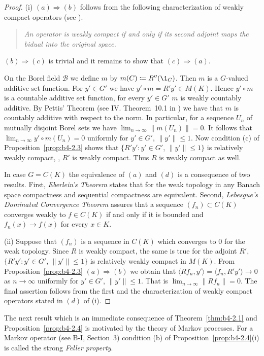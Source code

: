 \begin{proof}
(i) $(a)\Rightarrow(b)$ follows from the following characterization of
weakly compact operators (see \eg \citet[II. Proposition~9.4 ]{schaefer:1974}).
\begin{quote}
    \emph{
    An operator is weakly compact if and only if its second adjoint
    maps the bidual into the original space.
    }
\end{quote}
$(b)\Rightarrow(c)$ is trivial and it remains to show that $(c) \Rightarrow (a)$.

On the Borel field $\mathcal{B}$ we define $m$ by $m(C)  \coloneq  R''(\1_C)$.
Then $m$ is
a $G$-valued additive set function.
For $y' \in G'$ we have
$y'\circ m = R'y' \in M(K)$.
Hence $y'\circ m$ is a countable additive set function, for every $y' \in G'$  \ie $m$ is weakly countably additive.
By Pettis' Theorem (see IV. Theorem~10.1 in 
\citet{dunfordschwartz:1958}) we have
that $m$ is countably additive with respect to the norm.
In particular, for a sequence $U_n$ of mutually disjoint Borel sets we have
$\lim_{n\to\infty}\|m(U_n)\| = 0$.
It follows that $\lim_{n\to\infty}y'\circ m(U_n) = 0$ uniformly for
$y' \in G'$, $\|y'\| \leq 1$.
Now condition (c) of Proposition~\ref{prop:b4-2.3} shows that $\{R'y'
\colon y' \in G'$, $\|y'\| \leq 1\}$ is relatively weakly compact, \ie, $R'$ is
weakly compact.
Thus $R$ is weakly compact as well.

In case $G = C(K)$ the equivalence of $(a)$ and $(d)$ is a consequence of
two results. First, \emph{Eberlein's Theorem} states that for the weak topology in any Banach space compactness and sequential compactness are
equivalent.
Second, \emph{Lebesgue's Dominated Convergence Theorem} assures
that a sequence $(f_n) \subset C(K)$ converges weakly to $f \in C(K)$ if and
only if it is bounded and $f_n(x) \to f(x)$ for every $x \in K$.
	
(ii) Suppose that $(f_n)$ is a sequence in $C(K)$ which converges to $0$ for
the weak topology.
Since $R$ is weakly compact, the same is true for
the adjoint $R'$, \ie $\{R'y' \colon y' \in G'$, $\|y'\| \leq 1\}$ is relatively weakly compact in $M(K)$.
From Proposition~\ref{prop:b4-2.3} $(a)\Rightarrow(b)$ we obtain that
$\langle Rf_n,y'\rangle = \langle f_n,R'y'\rangle \to 0$ as $n \to \infty$ uniformly for $y' \in G'$, $\|y'\|\leq1$.
That is $\lim_{n\to\infty}\|Rf_n\| = 0$.
The final assertion follows from the first and the characterization of
weakly compact operators stated in $(d)$ of (i).
\end{proof}
The next result which is an immediate consequence of Theorem~\ref{thm:b4-2.1} and
Proposition~\ref{prop:b4-2.4} is motivated by the theory of Markov processes.
For a Markov operator (see B-I, Section~3) condition (b) of Proposition~\ref{prop:b4-2.4}(i) is called the strong \emph{Feller property}.

